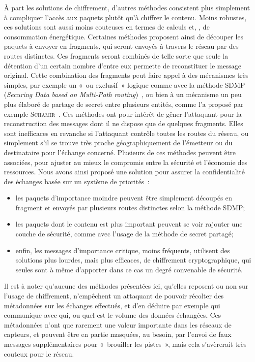 À part les solutions de chiffrement, d'autres méthodes consistent plus simplement à compliquer l'accès aux paquets plutôt qu'à chiffrer le contenu.
Moins robustes, ces solutions sont aussi moins couteuses en termes de calculs et, \infine, de consommation énergétique.
Certaines méthodes proposent ainsi de découper les paquets à envoyer en fragments, qui seront envoyés à travers le réseau par des routes distinctes.
Ces fragments seront combinés de telle sorte que seule la détention d'un certain nombre d'entre eux permette de reconstituer le message original.
Cette combination des fragments peut faire appel à des mécanismes très simples, par exemple un « ou exclusif » logique comme avec la méthode SDMP (\textit{Securing Data based on Multi-Path routing})~\cite{BM10}, ou bien à un mécanisme un peu plus élaboré de partage de secret entre plusieurs entités, comme l'a proposé par exemple \textsc{Schamir}~\cite{Sha79}.
Ces méthodes ont pour intérêt de gêner l'attaquant pour la reconstruction des messages dont il ne dispose que de quelques fragments.
Elles sont inefficaces en revanche si l'attaquant contrôle toutes les routes du réseau, ou simplement s'il se trouve très proche géographiquement de l'émetteur ou du destinataire pour l'échange concerné.
Plusieurs de ces méthodes peuvent être associées, pour ajuster au mieux le compromis entre la sécurité et l'économie des ressources.
Nous avons ainsi proposé une solution pour assurer la confidentialité des échanges basée sur un système de priorités~\cite{MMB13}:
\begin{itemize}
    \item les paquets d'importance moindre peuvent être simplement découpés en fragment et envoyés par plusieurs routes distinctes selon la méthode SDMP;
    \item les paquets dont le contenu est plus important peuvent se voir rajouter une couche de sécurité, comme avec l'usage de la méthode de secret partagé;
    \item enfin, les messages d'importance critique, moins fréquents, utilisent des solutions plus lourdes, mais plus efficaces, de chiffrement cryptographique, qui seules sont à même d'apporter dans ce cas un degré convenable de sécurité.
\end{itemize}

Il est à noter qu'aucune des méthodes présentées ici, qu'elles reposent ou non sur l'usage de chiffrement, n'empêchent un attaquant de pouvoir récolter des métadonnées sur les échanges effectués, et d'en déduire par exemple qui communique avec qui, ou quel est le volume des données échangées.
Ces métadonnées n'ont que rarement une valeur importante dans les réseaux de capteurs, et peuvent être en partie masquées, au besoin, par l'envoi de faux messages supplémentaires pour « brouiller les pistes », mais cela s'avèrerait très couteux pour le réseau.

